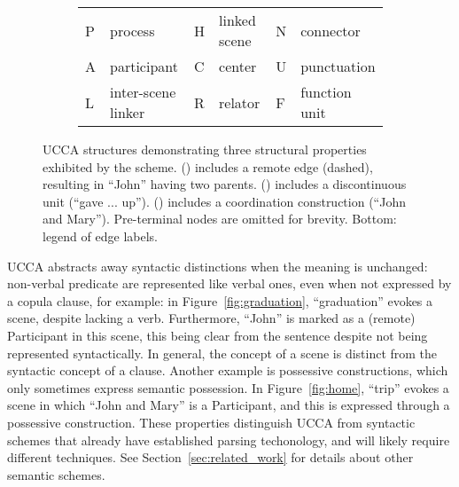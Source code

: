 \documentclass[11pt,a4paper]{article}
\newcommand{\secref}[1]{Section~\ref{#1}}
\newcommand{\figref}[1]{Figure~\ref{#1}}
\begin{document}
\begin{figure}[t]
\begin{subfigure}{.9\columnwidth}
  \hspace{.1\columnwidth}
  \parbox{.8\columnwidth}{
  }
  \end{subfigure}
  \begin{subfigure}{.9\columnwidth}
  \hspace{.05\columnwidth}
  \begin{adjustbox}{width=\columnwidth,margin=1pt,frame}
  \begin{tabular}{ll|ll|ll}
  P & process & H & linked scene & N & connector \\
  A & participant & C & center & U & punctuation \\
  L & inter-scene linker & R & relator & F & function unit
  \end{tabular}
  \end{adjustbox}
  \end{subfigure}
  \caption{\label{fig:examples}
    UCCA structures demonstrating three structural properties exhibited by
    the scheme.
    () includes a remote edge (dashed),
    resulting in ``John'' having two parents.
    () includes a discontinuous unit (``gave ... up'').
    () includes a coordination construction (``John and Mary'').
    Pre-terminal nodes are omitted for brevity.
    Bottom: legend of edge labels.
  }
\end{figure}

UCCA abstracts away syntactic distinctions when the meaning is unchanged:
non-verbal predicate are represented like verbal ones,
even when not expressed by a copula clause, for example:
in \figref{fig:graduation}, ``graduation'' evokes a scene,
despite lacking a verb.
Furthermore, ``John'' is marked as a (remote) Participant in this
scene, this being clear from the sentence despite not being represented
syntactically.
In general, the concept of a scene is distinct from the syntactic concept of
a clause.
Another example is possessive constructions,
which only sometimes express semantic possession.
In \figref{fig:home}, ``trip'' evokes a scene in which ``John and Mary'' is
a Participant, and this is expressed through a possessive construction.
These properties distinguish UCCA from syntactic schemes that
already have established parsing techonology,
and will likely require different techniques.
See \secref{sec:related_work} for details about other semantic schemes.
\end{document}
